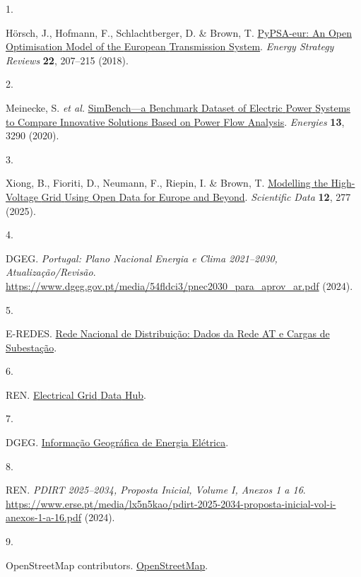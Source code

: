 \documentclass[
  10pt]{article}
\newlength{\cslhangindent}
\newlength{\csllabelwidth}
\newenvironment{CSLReferences}[2] %
 {\begin{list}{}{%
  \setlength{\itemindent}{0pt}
  \setlength{\leftmargin}{0pt}
  \setlength{\parsep}{0pt}
  \ifodd #1
   \setlength{\leftmargin}{\cslhangindent}
   \setlength{\itemindent}{-1\cslhangindent}
  \fi
  \setlength{\itemsep}{#2\baselineskip}}}
 {\end{list}}
\newcommand{\CSLLeftMargin}[1]{\parbox[t]{\csllabelwidth}{\strut#1\strut}}
\newcommand{\CSLRightInline}[1]{\parbox[t]{\linewidth - \csllabelwidth}{\strut#1\strut}}
\begin{document}
\label{refs}
\begin{CSLReferences}{0}{0}
\CSLLeftMargin{1. }%
\CSLRightInline{Hörsch, J., Hofmann, F., Schlachtberger, D. \& Brown, T.
\href{https://doi.org/10.1016/j.esr.2018.08.012}{PyPSA-eur: {An} {Open}
{Optimisation} {Model} of the {European} {Transmission} {System}}.
\emph{Energy Strategy Reviews} \textbf{22}, 207--215 (2018).}

\CSLLeftMargin{2. }%
\CSLRightInline{Meinecke, S. \emph{et al.}
\href{https://doi.org/10.3390/en13123290}{SimBench---a {Benchmark}
{Dataset} of {Electric} {Power} {Systems} to {Compare} {Innovative}
{Solutions} {Based} on {Power} {Flow} {Analysis}}. \emph{Energies}
\textbf{13}, 3290 (2020).}

\CSLLeftMargin{3. }%
\CSLRightInline{Xiong, B., Fioriti, D., Neumann, F., Riepin, I. \&
Brown, T. \href{https://doi.org/10.1038/s41597-025-04550-7}{Modelling
the {High-Voltage} {Grid} {Using} {Open} {Data} for {Europe} and
{Beyond}}. \emph{Scientific Data} \textbf{12}, 277 (2025).}

\CSLLeftMargin{4. }%
\CSLRightInline{DGEG. \emph{Portugal: {Plano} {Nacional} {Energia} e
{Clima} 2021--2030, Atualização/Revisão}.
\url{https://www.dgeg.gov.pt/media/54fldci3/pnec2030_para_aprov_ar.pdf}
(2024).}

\CSLLeftMargin{5. }%
\CSLRightInline{E-REDES.
\href{https://e-redes.opendatasoft.com/pages/rnd/}{Rede {Nacional} de
{Distribuição:} {Dados} da {Rede} {AT} e {Cargas} de {Subestação}}.}

\CSLLeftMargin{6. }%
\CSLRightInline{REN.
\href{https://datahub.ren.pt/en/networks/electrical-grid/}{Electrical
{Grid} {Data} {Hub}}.}

\CSLLeftMargin{7. }%
\CSLRightInline{DGEG.
\href{https://www.dgeg.gov.pt/pt/servicos-online/setor-energetico/}{Informação
{Geográfica} de {Energia} {Elétrica}}.}

\CSLLeftMargin{8. }%
\CSLRightInline{REN. \emph{PDIRT 2025--2034, {Proposta} {Inicial,}
{Volume} {I,} {Anexos} 1 a 16}.
\url{https://www.erse.pt/media/lx5n5kao/pdirt-2025-2034-proposta-inicial-vol-i-anexos-1-a-16.pdf}
(2024).}

\CSLLeftMargin{9. }%
\CSLRightInline{OpenStreetMap contributors.
\href{https://www.openstreetmap.org/copyright}{OpenStreetMap}.}


\end{CSLReferences}
\end{document}
